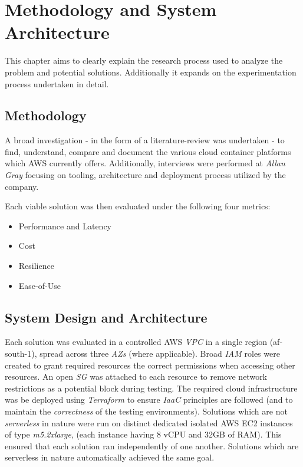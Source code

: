 \part{Methodology and System Architecture}

This chapter aims to clearly explain the research process used to analyze the problem and potential solutions.
Additionally it expands on the experimentation process undertaken in detail.

\chapter{Methodology}
A broad investigation - in the form of a literature-review was undertaken - to find, understand, compare and document the various cloud container platforms which AWS currently offers.
Additionally, interviews were performed at \emph{Allan Gray} focusing on tooling, architecture and deployment process utilized by the company.

\noindent \newline Each viable solution was then evaluated under the following four metrics:
\begin{itemize}
  \item Performance and Latency
  \item Cost
  \item Resilience
  \item Ease-of-Use
\end{itemize}

\chapter{System Design and Architecture}

Each solution was evaluated in a controlled AWS \emph{VPC} in a single region (af-south-1), spread across three \emph{AZs} (where applicable).
Broad \textit{IAM} roles were created to grant required resources the correct permissions when accessing other resources.
An open \textit{SG} was attached to each resource to remove network restrictions as a potential block during testing.
The required cloud infrastructure was be deployed using \emph{Terraform} to ensure \emph{IaaC} principles are followed (and to maintain the \emph{correctness} of the testing environments).
Solutions which are not \emph{serverless} in nature were run on distinct dedicated isolated AWS EC2 instances of type \emph{m5.2xlarge}\cite{m5}, (each instance having 8 vCPU and 32GB of RAM). This ensured that each solution ran independently of one another.
Solutions which are serverless in nature automatically achieved the same goal.

